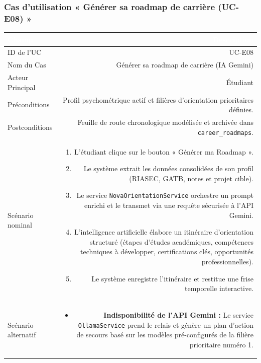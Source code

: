 \vspace{1.5em}

\subsubsection*{Cas d'utilisation « Générer sa roadmap de carrière (UC-E08) »}

\noindent
\begin{tabular}{|L|R|}
\hline
{}\textcolor{white}{\textbf{Champ}} & \textcolor{white}{\textbf{Description}} \\
\hline
{}ID de l'UC & UC-E08 \\
\hline
Nom du Cas & Générer sa roadmap de carrière (IA Gemini) \\
\hline
{}Acteur Principal & Étudiant \\
\hline
Préconditions & Profil psychométrique actif et filières d'orientation prioritaires définies. \\
\hline
{}Postconditions & Feuille de route chronologique modélisée et archivée dans \texttt{career\_roadmaps}. \\
\hline
Scénario nominal &
\begin{enumerate}
  \item L'étudiant clique sur le bouton « Générer ma Roadmap ».
  \item Le système extrait les données consolidées de son profil (RIASEC, GATB, notes et projet cible).
  \item Le service \texttt{NovaOrientationService} orchestre un prompt enrichi et le transmet via une requête sécurisée à l'API Gemini.
  \item L'intelligence artificielle élabore un itinéraire d'orientation structuré (étapes d'études académiques, compétences techniques à développer, certifications clés, opportunités professionnelles).
  \item Le système enregistre l'itinéraire et restitue une frise temporelle interactive.
\end{enumerate} \\
\hline
{}Scénario alternatif &
\begin{itemize}
  \item \textbf{Indisponibilité de l'API Gemini :} Le service \texttt{OllamaService} prend le relais et génère un plan d'action de secours basé sur les modèles pré-configurés de la filière prioritaire numéro 1.
\end{itemize} \\
\hline
\end{tabular}

